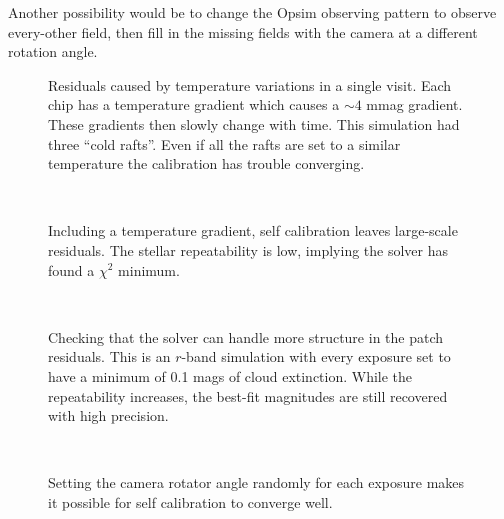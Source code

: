 Another possibility would be to change the Opsim observing pattern to observe every-other field, then fill in the missing fields with the camera at a different rotation angle.  %

\begin{figure}
\caption{Residuals caused by temperature variations in a single visit.  Each chip has a temperature gradient which causes a $\sim 4$ mmag gradient.  These gradients then slowly change with time.  This simulation had three ``cold rafts''.  Even if all the rafts are set to a similar temperature the calibration has trouble converging.  \label{dmag_temperature}}
\end{figure}

\begin{figure}
\\
\caption{Including a temperature gradient, self calibration leaves large-scale residuals.  The stellar repeatability is low, implying the solver has found a $\chi^2$ minimum. \label{y_chip}}
\end{figure}

\begin{figure}
\\
\caption{Checking that the solver can handle more structure in the patch residuals.  This is an $r$-band simulation with every exposure set to have a minimum of 0.1 mags of cloud extinction.  While the repeatability increases, the best-fit magnitudes are still recovered with high precision. \label{min_clouds}}
\end{figure}

\begin{figure}
\\
\caption{Setting the camera rotator angle randomly for each exposure makes it possible for self calibration to converge well. \label{randrot}}
\end{figure}


